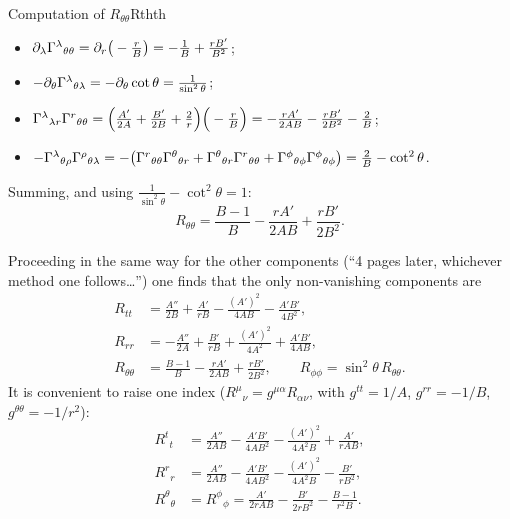 \begin{example}{Computation of $R_{\theta\theta}$}{Rthth}
\begin{itemize}[nosep]
\item $\partial_\lambda\Gamma^{\lambda}{}_{\theta\theta}=\partial_r\big(-\frac rB\big)=-\frac1B+\frac{rB'}{B^2}$;
\item $-\partial_\theta\Gamma^{\lambda}{}_{\theta\lambda}=-\partial_\theta\cot\theta=\frac{1}{\sin^2\theta}$;
\item $\Gamma^{\lambda}{}_{\lambda r}\Gamma^{r}{}_{\theta\theta}=\Big(\frac{A'}{2A}+\frac{B'}{2B}+\frac2r\Big)\Big(-\frac rB\Big)=-\frac{rA'}{2AB}-\frac{rB'}{2B^2}-\frac2B$;
\item $-\Gamma^{\lambda}{}_{\theta\rho}\Gamma^{\rho}{}_{\theta\lambda}=-\big(\Gamma^{r}{}_{\theta\theta}\Gamma^{\theta}{}_{\theta r}+\Gamma^{\theta}{}_{\theta r}\Gamma^{r}{}_{\theta\theta}+\Gamma^{\phi}{}_{\theta\phi}\Gamma^{\phi}{}_{\theta\phi}\big)=\frac2B-\cot^2\theta$.
\end{itemize}
Summing, and using $\frac1{\sin^2\theta}-\cot^2\theta=1$:
\[
  R_{\theta\theta}=\frac{B-1}{B}-\frac{rA'}{2AB}+\frac{rB'}{2B^2}.
\]
\end{example}
Proceeding in the same way for the other components (``4 pages later, whichever method one follows\dots'') one finds that the only non-vanishing components are
\begin{align}
  R_{tt}&=\frac{A''}{2B}+\frac{A'}{rB}-\frac{(A')^2}{4AB}-\frac{A'B'}{4B^2},\nonumber\\
  R_{rr}&=-\frac{A''}{2A}+\frac{B'}{rB}+\frac{(A')^2}{4A^2}+\frac{A'B'}{4AB},\nonumber\\
  R_{\theta\theta}&=\frac{B-1}{B}-\frac{rA'}{2AB}+\frac{rB'}{2B^2},\qquad R_{\phi\phi}=\sin^2\theta\,R_{\theta\theta}.
  \label{eq:ricci-static}
\end{align}
It is convenient to raise one index ($R^\mu{}_\nu=g^{\mu\alpha}R_{\alpha\nu}$, with $g^{tt}=1/A$, $g^{rr}=-1/B$, $g^{\theta\theta}=-1/r^2$):
\begin{align}
  R^t{}_t&=\frac{A''}{2AB}-\frac{A'B'}{4AB^2}-\frac{(A')^2}{4A^2B}+\frac{A'}{rAB},\nonumber\\
  R^r{}_r&=\frac{A''}{2AB}-\frac{A'B'}{4AB^2}-\frac{(A')^2}{4A^2B}-\frac{B'}{rB^2},\nonumber\\
  R^\theta{}_\theta&=R^\phi{}_\phi=\frac{A'}{2rAB}-\frac{B'}{2rB^2}-\frac{B-1}{r^2B}.
\end{align}

